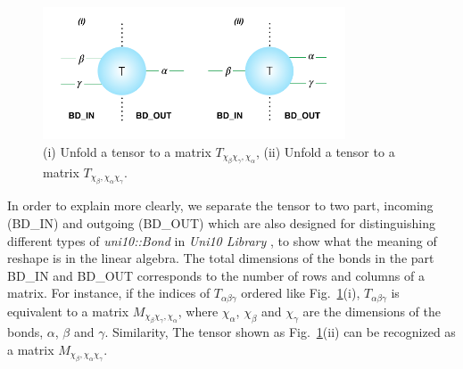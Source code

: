 \begin{figure}[ht]
	\centering
	\includegraphics[width=0.80\textwidth]{figures/fig221.png}
	\caption[Representaion of unfold tensors.]{(i) Unfold a tensor to a matrix $T_{\chi_{\beta}\chi_{\gamma},\chi_{\alpha}}$, (ii) Unfold a tensor to a matrix $T_{\chi_{\beta},\chi_{\alpha}\chi_{\gamma}}$.}
	\label{fig221}
\end{figure}

In order to explain more clearly, we separate the tensor to two part, incoming (BD\_IN) and outgoing (BD\_OUT) which are also designed for distinguishing different types of \textit{uni10::Bond} in \textit{Uni10 Library} \cite{}, to show what the meaning of reshape is in the linear algebra. The total dimensions of the bonds in the part BD\_IN and BD\_OUT corresponds to the number of rows and columns of a matrix. For instance, if the indices of $T_{\alpha \beta \gamma}$ ordered like Fig.~\ref{fig221}(i), $T_{\alpha \beta \gamma}$ is equivalent to a matrix $M_{\chi_{\beta}\chi_{\gamma},\chi_{\alpha}}$, where $\chi_{\alpha}$, $\chi_{\beta}$ and $\chi_{\gamma}$ are the dimensions of the bonds, $\alpha$, $\beta$ and $\gamma$. Similarity, The tensor shown as Fig.~\ref{fig221}(ii) can be recognized as a matrix $M_{\chi_{\beta},\chi_{\alpha}\chi_{\gamma}}$.

